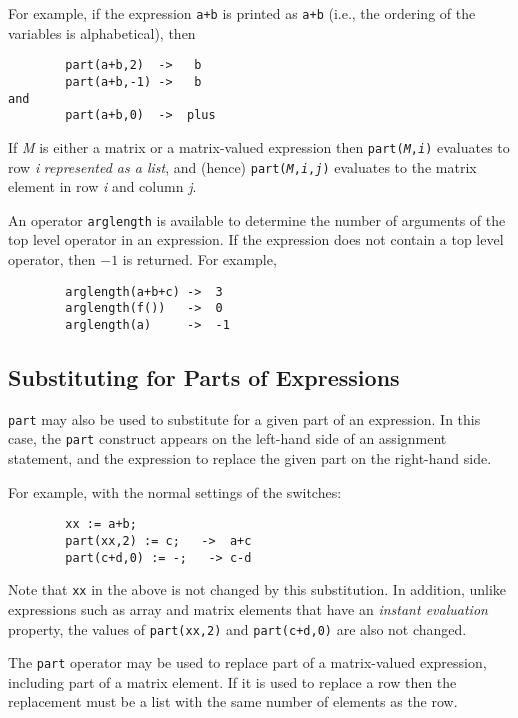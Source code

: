 For example, if the expression \texttt{a+b} is printed as \texttt{a+b} (i.e.,
the ordering of the variables is alphabetical), then
\begin{verbatim}
        part(a+b,2)  ->   b
        part(a+b,-1) ->   b
and
        part(a+b,0)  ->  plus
\end{verbatim}

If \emph{M} is either a matrix or a matrix-valued expression then
\texttt{part(\emph{M},\emph{i})} evaluates to row \emph{i}
\emph{represented as a list}, and (hence)
\texttt{part(\emph{M},\emph{i},\emph{j})} evaluates to the matrix
element in row \emph{i} and column \emph{j}.

\hypertarget{operator:ARGLENGTH}{}
An operator \texttt{arglength} is available to determine
the number of arguments of the top level operator in an expression.  If
the expression does not contain a top level operator, then $-1$ is returned.
For example,
\begin{verbatim}
        arglength(a+b+c) ->  3
        arglength(f())   ->  0
        arglength(a)     ->  -1
\end{verbatim}

\subsection{Substituting for Parts of Expressions}

\texttt{part} may also be used to substitute for a given part of an
expression.  In this case, the \texttt{part} construct appears on the
left-hand side of an assignment statement, and the expression to replace
the given part on the right-hand side.

For example, with the normal settings of the {\REDUCE} switches:
\begin{verbatim}
        xx := a+b;
        part(xx,2) := c;   ->  a+c
        part(c+d,0) := -;   -> c-d
\end{verbatim}

Note that \texttt{xx} in the above is not changed by this substitution.  In
addition, unlike expressions such as array and matrix elements that have
an \emph{instant evaluation\/} property, the values
of \texttt{part(xx,2)} and \texttt{part(c+d,0)} are also not changed.

The \texttt{part} operator may be used to replace part of a
matrix-valued expression, including part of a matrix element.  If it
is used to replace a row then the replacement must be a list with the
same number of elements as the row.


